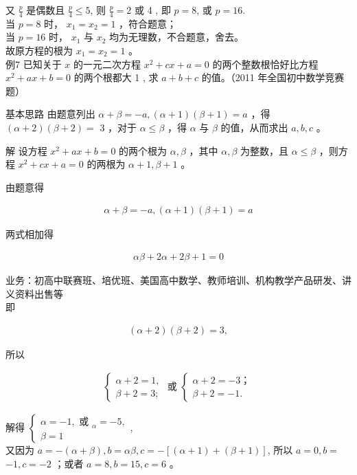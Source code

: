 \documentclass[10pt]{article}
\begin{document}
又 $\frac{p}{4}$ 是偶数且 $\frac{p}{4} \leqslant 5$, 则 $\frac{p}{4}=2$ 或 4 , 即 $p=8$, 或 $p=16$.\\
当 $p=8$ 时， $x_{1}=x_{2}=1$ ，符合题意；\\
当 $p=16$ 时， $x_{1}$ 与 $x_{2}$ 均为无理数，不合题意，舍去。\\
故原方程的根为 $x_{1}=x_{2}=1$ 。\\
例7 已知关于 $x$ 的一元二次方程 $x^{2}+c x+a=0$ 的两个整数根恰好比方程 $x^{2}+a x+b=0$ 的两个根都大 1 , 求 $a+b+c$ 的值。（2011 年全国初中数学竞赛题）

基本思路 由题意列出 $\alpha+\beta=-a,(\alpha+1)(\beta+1)=a$ ，得 $(\alpha+2)(\beta+2)=$ 3 ，对于 $\alpha \leqslant \beta$ ，得 $\alpha$ 与 $\beta$ 的值，从而求出 $a, b, c$ 。

解 设方程 $x^{2}+a x+b=0$ 的两个根为 $\alpha, \beta$ ，其中 $\alpha, \beta$ 为整数，且 $\alpha \leqslant \beta$ ，则方程 $x^{2}+c x+a=0$ 的两根为 $\alpha+1, \beta+1$ 。

由题意得

\begin{align*}
\alpha+\beta=-a,(\alpha+1)(\beta+1)=a
\end{align*}

两式相加得

\begin{align*}
\alpha \beta+2 \alpha+2 \beta+1=0
\end{align*}

业务：初高中联赛班、培优班、美国高中数学、教师培训、机构教学产品研发、讲义资料出售等\\
即

\begin{align*}
(\alpha+2)(\beta+2)=3,
\end{align*}

所以

\begin{align*}
\left\{\begin{array} { l } 
{ \alpha + 2 = 1 , } \\
{ \beta + 2 = 3 ; }
\end{array} \text { 或 } \left\{\begin{array}{l}
\alpha+2=-3 ； \\
\beta+2=-1 .
\end{array}\right.\right.
\end{align*}

解得 $\left\{\begin{array}{l}\alpha=-1, \text { 或 }_{\alpha}=-5, \\ \beta=1\end{array}\right.$,\\
又因为 $a=-(\alpha+\beta), b=\alpha \beta, c=-[(\alpha+1)+(\beta+1)]$, 所以 $a=0, b=$ $-1, c=-2$ ；或者 $a=8, b=15, c=6$ 。
\end{document}
